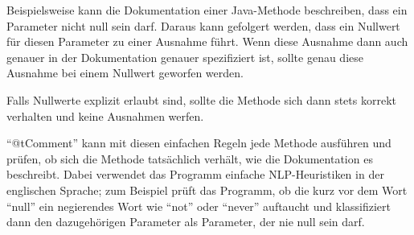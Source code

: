 Beispielsweise kann die Dokumentation einer Java-Methode beschreiben, dass ein Parameter nicht null sein darf. Daraus kann gefolgert werden, dass ein Nullwert für diesen Parameter zu einer Ausnahme führt. Wenn diese Ausnahme dann auch genauer in der Dokumentation genauer spezifiziert ist, sollte genau diese Ausnahme bei einem Nullwert geworfen werden. 

Falls Nullwerte explizit erlaubt sind, sollte die Methode sich dann stets korrekt verhalten und keine Ausnahmen werfen. 

\enquote{@tComment} kann mit diesen einfachen Regeln jede Methode ausführen und prüfen, ob sich die Methode tatsächlich verhält, wie die Dokumentation es beschreibt. Dabei verwendet das Programm einfache \ac{NLP}-Heuristiken in der englischen Sprache; zum Beispiel prüft das Programm, ob die kurz vor dem Wort \enquote{null} ein negierendes Wort wie \enquote{not} oder \enquote{never} auftaucht und klassifiziert dann den dazugehörigen Parameter als Parameter, der nie null sein darf. 

